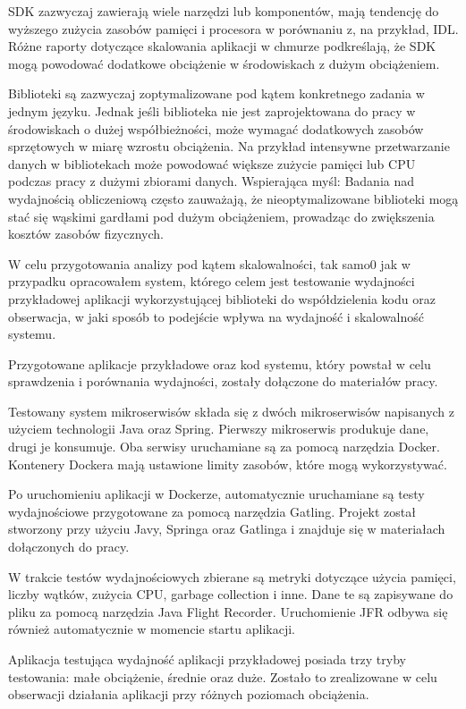 \documentclass[runningheads,12pt]{llncs}
\begin{document}
SDK zazwyczaj zawierają wiele narzędzi lub komponentów, mają tendencję do wyższego zużycia zasobów pamięci i procesora w porównaniu z, na przykład, IDL. Różne raporty dotyczące skalowania aplikacji w chmurze podkreślają, że SDK mogą powodować dodatkowe obciążenie w środowiskach z dużym obciążeniem. ~\cite[para 3]{azure2020}

Biblioteki są zazwyczaj zoptymalizowane pod kątem konkretnego zadania w jednym języku. Jednak jeśli biblioteka nie jest zaprojektowana do pracy w środowiskach o dużej współbieżności, może wymagać dodatkowych zasobów sprzętowych w miarę wzrostu obciążenia. Na przykład intensywne przetwarzanie danych w bibliotekach może powodować większe zużycie pamięci lub CPU podczas pracy z dużymi zbiorami danych. Wspierająca myśl: Badania nad wydajnością obliczeniową często zauważają, że nieoptymalizowane biblioteki mogą stać się wąskimi gardłami pod dużym obciążeniem, prowadząc do zwiększenia kosztów zasobów fizycznych. ~\cite[p. 192]{fowler2012patterns}

W celu przygotowania analizy pod kątem skalowalności, tak samo0 jak w przypadku opracowałem system, którego celem jest testowanie wydajności przykładowej aplikacji wykorzystującej biblioteki do współdzielenia kodu oraz obserwacja, w jaki sposób to podejście wpływa na wydajność i skalowalność systemu.

Przygotowane aplikacje przykładowe oraz kod systemu, który powstał w celu sprawdzenia i porównania wydajności, zostały dołączone do materiałów pracy.

Testowany system mikroserwisów składa się z dwóch mikroserwisów napisanych z użyciem technologii Java oraz Spring. Pierwszy mikroserwis produkuje dane, drugi je konsumuje. Oba serwisy uruchamiane są za pomocą narzędzia Docker. Kontenery Dockera mają ustawione limity zasobów, które mogą wykorzystywać.

Po uruchomieniu aplikacji w Dockerze, automatycznie uruchamiane są testy wydajnościowe przygotowane za pomocą narzędzia Gatling. Projekt został stworzony przy użyciu Javy, Springa oraz Gatlinga i znajduje się w materiałach dołączonych do pracy.

W trakcie testów wydajnościowych zbierane są metryki dotyczące użycia pamięci, liczby wątków, zużycia CPU, garbage collection i inne. Dane te są zapisywane do pliku za pomocą narzędzia Java Flight Recorder. Uruchomienie JFR odbywa się również automatycznie w momencie startu aplikacji.

Aplikacja testująca wydajność aplikacji przykładowej posiada trzy tryby testowania: małe obciążenie, średnie oraz duże. Zostało to zrealizowane w celu obserwacji działania aplikacji przy różnych poziomach obciążenia.
\end{document}

